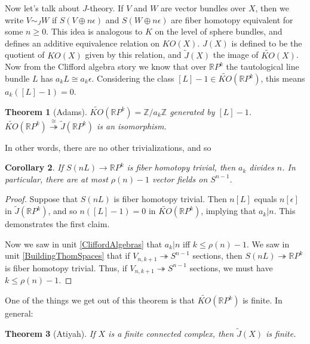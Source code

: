\documentclass{article}
\newcommand{\Z}{\mathbb{Z}}
\newcommand{\R}{\mathbb{R}}
\newcommand{\RP}{\R P}
\newcommand{\onto}{\twoheadrightarrow}
\renewcommand{\to}{\longrightarrow}
\newtheorem{thm}{Theorem}[section]
\newtheorem{cor}[thm]{Corollary}
\theoremstyle{definition}
\begin{document}
Now let's talk about $J$-theory.  If $V$ and $W$ are vector bundles over $X$, then we write $V \sim_J W$ if $S(V \oplus n \epsilon)$ and $S(W \oplus n \epsilon)$ are fiber homotopy equivalent for some $n\geq0$. This idea is analogous to $K$ on the level of sphere bundles, and defines an additive equivalence relation on $KO(X)$. $J(X)$ is defined to be the quotient of $KO(X)$ given by this relation, and $\widetilde J(X)$ the image of $\widetilde{KO}(X)$. %
Now from the Clifford algebra story we know that over $\RP^k$ the tautological line bundle $L$ has $a_k L \cong a_k \epsilon$. %
Considering the class $[L] - 1 \in \widetilde{KO}(\RP^k)$, this means $a_k([L] - 1) = 0$. %
\begin{thm}[Adams]\label{AdamsKORPn}
$\widetilde{KO}(\RP^k)=\Z/a_k\Z$ generated by $[L]-1$.
$\widetilde{KO}(\RP^k) \stackrel{\cong}{\onto} \widetilde J(\RP^k)$ is an isomorphism.
\end{thm}
In other words, there are no other trivializations, and so %
\begin{cor}
If $S(nL) \to \RP^k$ is fiber homotopy trivial, then $a_k$ divides $n$. In particular, there are at most $\rho(n) - 1$ vector fields on $S^{n-1}$. %
\end{cor}
\begin{proof}
Suppose that $S(nL)$ is fiber homotopy trivial. Then $n[L]$ equals $n[\epsilon]$ in $\widetilde J(\R P^k)$, and so $n([L]-1)=0$ in $\widetilde{KO}(\RP^k)$, implying that $a_k|n$. This demonstrates the first claim.

Now we saw in unit \ref{CliffordAlgebras} that $a_k|n$ iff $k\leq \rho(n)-1$. We saw in unit \ref{BuildingThomSpaces} that if $V_{n, k+1} \onto S^{n-1}$ sections, then $S(nL)\onto \R P^{k}$ is fiber homotopy trivial. Thus, if $V_{n, k+1} \onto S^{n-1}$ sections, we must have $k\leq\rho(n)-1$.
\end{proof}
One of the things we get out of this theorem is that $\widetilde{KO}(\RP^k)$ is finite. In general: %
\begin{thm}[Atiyah]
If $X$ is a finite connected complex, then $\widetilde J(X)$ is finite.
\end{thm}
\end{document}
